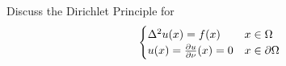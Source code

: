 Discuss the Dirichlet Principle for
$$
\begin{cases}
  \Delta^2 u(x) = f(x) & x \in \Omega\\
  u(x) = \frac{\partial u}{\partial \nu}(x) = 0 & x \in \partial \Omega
\end{cases}
$$
